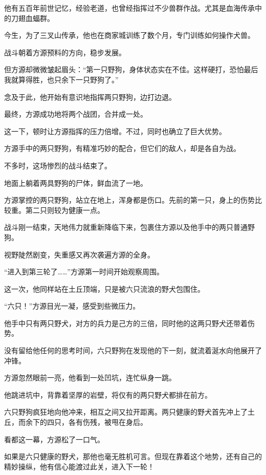 \begin{this_body}
他有五百年前世记忆，经验老道，也曾经指挥过不少兽群作战。尤其是血海传承中的刀翅血蝠群。

今生，为了三叉山传承，他也在商家城训练了数个月，专门训练如何操作犬兽。

战斗朝着方源预料的方向，稳步发展。

但方源却微微皱起眉头：“第一只野狗，身体状态实在不佳。这样硬打，恐怕最后我就算得胜，也只余下一只野狗了。”

念及于此，他开始有意识地指挥两只野狗，边打边退。

最终，方源成功地将两个战团，合并成一处。

这一下，顿时让方源指挥的压力倍增。不过，同时也确立了巨大优势。

方源手中的两只野狗，有精准巧妙的配合，但它们的敌人，却是各自为战。

不多时，这场惨烈的战斗结束了。

地面上躺着两具野狗的尸体，鲜血流了一地。

方源掌控的两只野狗，站立在地上，浑身都是伤口。先前的第一只，身上的伤势比较重。第二只则较为健康一点。

战斗刚一结束，天地伟力就重新降临下来，包裹住方源以及他手中的两只普通野狗。

视野陡然剧变，失重感又再次袭遍方源的全身。

“进入到第三轮了……”方源第一时间开始观察周围。

这一次，他同样站在土丘顶端，只是被六只流浪的野犬包围住。

“六只！”方源目光一凝，感受到些微压力。

他手中只有两只野犬，对方的兵力是己方的三倍，同时他的这两只野犬还带着伤势。

没有留给他任何的思考时间，六只野狗在发现他的下一刻，就流着涎水向他展开了冲锋。

方源忽然眼前一亮，他看到一处凹坑，连忙纵身一跳。

他跳进坑中，背靠着坚厚的岩壁，将仅有的两只野犬都排在前方。

六只野狗疯狂地向他冲来，相互之间又拉开距离。两只健康的野犬首先冲上了土丘，而余下的四只，各有伤残，被甩在身后。

看都这一幕，方源松了一口气。

如果是六只健康的野犬，那他也毫无胜机可言。但现在靠着这个地势，还有自己的精妙操纵，他有信心能渡过此关，进入下一轮！

\end{this_body}

